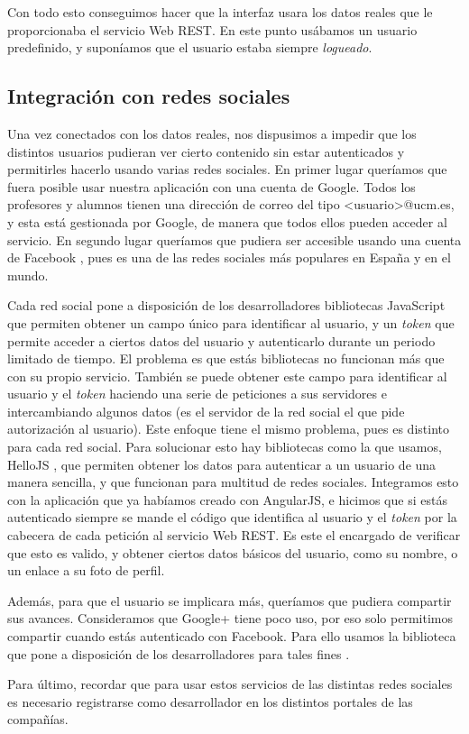 Con todo esto conseguimos hacer que la interfaz usara los datos reales que le proporcionaba el servicio Web REST. En este punto usábamos un usuario predefinido, y suponíamos que el usuario estaba siempre \emph{logueado}.

\subsection{Integración con redes sociales\label{subsec:redes_sociales}}
Una vez conectados con los datos reales, nos dispusimos a impedir que los distintos usuarios pudieran ver cierto contenido sin estar autenticados y permitirles hacerlo usando varias redes sociales. En primer lugar queríamos que fuera posible usar nuestra aplicación con una cuenta de Google. Todos los profesores y alumnos tienen una dirección de correo del tipo \textless usuario\textgreater @ucm.es, y esta está gestionada por Google, de manera que todos ellos  pueden acceder al servicio. En segundo lugar queríamos que pudiera ser accesible usando una cuenta de Facebook \cite{facebook}, pues es una de las redes sociales más populares en España y en el mundo. 

Cada red social pone a disposición de los desarrolladores bibliotecas JavaScript que permiten obtener un campo único para identificar al usuario, y un \emph{token} que permite acceder a ciertos datos del usuario y autenticarlo durante un periodo limitado de tiempo. El problema es que estás bibliotecas no funcionan más que con su propio servicio. También se puede obtener este campo para identificar al usuario y el \emph{token} haciendo una serie de peticiones a sus servidores e intercambiando algunos datos (es el servidor de la red social el que pide autorización al usuario). Este enfoque tiene el mismo problema, pues es distinto para cada red social. Para solucionar esto hay bibliotecas como la que usamos, HelloJS \cite{hello}, que permiten obtener los datos para autenticar a un usuario de una manera sencilla, y que funcionan para multitud de redes sociales. Integramos esto con la aplicación que ya habíamos creado con AngularJS, e hicimos que si estás autenticado siempre se mande el código que identifica al usuario y el \emph{token} por la cabecera de cada petición al servicio Web REST. Es este el encargado de verificar que esto es valido, y obtener ciertos datos básicos del usuario, como su nombre, o un enlace a su foto de perfil.

Además, para que el usuario se implicara más, queríamos que pudiera compartir sus avances. Consideramos que Google+ tiene poco uso, por eso solo permitimos compartir cuando estás autenticado con Facebook. Para ello usamos la biblioteca que pone a disposición de los desarrolladores para tales fines \cite{libreriaFacebook}.

Para último, recordar que para usar estos servicios de las distintas redes sociales es necesario registrarse como desarrollador en los distintos portales de las compañías.